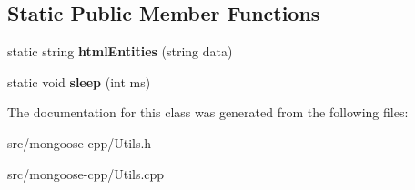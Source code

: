 \subsection*{Static Public Member Functions}
\begin{DoxyCompactItemize}
\item 
static string {\bfseries html\+Entities} (string data)\hypertarget{classMongoose_1_1Utils_ae4f29018ec40534647ca19f482e86ae9}{}\label{classMongoose_1_1Utils_ae4f29018ec40534647ca19f482e86ae9}

\item 
static void {\bfseries sleep} (int ms)\hypertarget{classMongoose_1_1Utils_ab3b3bd556381d74b01336543dd0cb129}{}\label{classMongoose_1_1Utils_ab3b3bd556381d74b01336543dd0cb129}

\end{DoxyCompactItemize}


The documentation for this class was generated from the following files\+:\begin{DoxyCompactItemize}
\item 
src/mongoose-\/cpp/Utils.\+h\item 
src/mongoose-\/cpp/Utils.\+cpp\end{DoxyCompactItemize}

